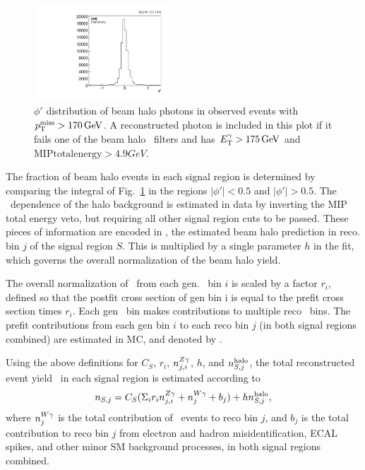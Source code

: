 \begin{figure}[tbp]
  \begin{center}
    \includegraphics[width=0.45\textwidth]{figures/noncol/phiHaloFolded.pdf}
    \caption{
      $\phi'$ distribution of beam halo photons in observed events with $\MET > 170\unit{GeV}$. A reconstructed photon is included
      in this plot if it fails one of the beam halo \MET\ filters and has $\ETgamma > 175\unit{GeV}$ and
      $\mathrm{MIP total energy}>4.9\unit{GeV}$.
    }
    \label{fig:halophi}
  \end{center}
\end{figure}

The fraction of beam halo events in each signal region is determined by comparing the integral of Fig.~\ref{fig:halophi} in the regions
$|\phi'| < 0.5$ and $|\phi'| > 0.5$. The \ETgamma\ dependence of the halo background is estimated in data
by inverting the MIP total energy veto, but requiring all other signal region cuts to be passed. These pieces of information are encoded in 
\nhalo[,j], the estimated beam halo prediction in reco. bin $j$ of the signal region $S$. This is multiplied by a
single parameter $h$ in the fit, which governs the overall normalization of the beam halo yield.

The overall normalization of \zinvg\ from each gen. \pTgamma\ bin $i$ is scaled by a factor $r_{i}$, defined so that
the postfit cross section of gen bin i is equal to the prefit cross section times $r_{i}$.
Each gen \pTgamma\ bin makes contributions to multiple reco \ETgamma\ bins.
The prefit contributions from each gen bin $i$ to each reco bin $j$ (in both signal regions combined) are estimated in MC, and denoted by \nZg[j,i].

Using the above definitions for $C_{S}$, $r_{i}$, $\nZg[j,i]$, $h$, and $\nhalo[,j]$,
the total reconstructed event yield \nS\ in each signal region is estimated according to
\begin{equation}
  \nS[,j] = C_{S} (\Sigma_{i}r_{i}\nZg[j,i] + \nWg[j] + b_{j}) + h\nhalo[,j],
\end{equation}
where $\nWg[j]$ is the total contribution of \wlng\ events to reco bin $j$, and $b_{j}$ is the total contribution to reco bin $j$ from
electron and hadron misidentification, ECAL spikes, and other minor SM background processes, in both signal regions combined.

